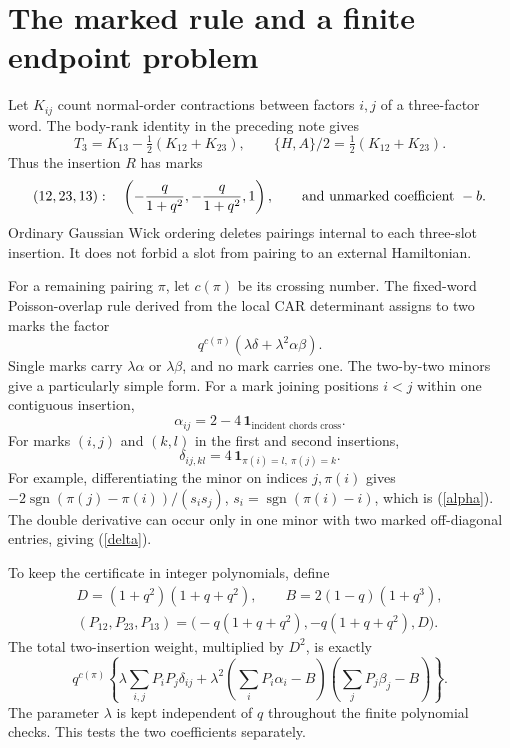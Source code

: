 \documentclass[11pt,a4paper]{article}
\begin{document}
\newpage
\section{The marked rule and a finite endpoint problem}
Let $K_{ij}$ count normal-order contractions between factors $i,j$
of a three-factor word. The body-rank identity in the preceding
note gives
\[
 T_3=K_{13}-\tfrac12(K_{12}+K_{23}),\qquad
 \{H,A\}/2=\tfrac12(K_{12}+K_{23}).
\]
Thus the insertion $R$ has marks
\begin{equation}
 (12,23,13):\quad
 \left(-\frac{q}{1+q^2},-\frac{q}{1+q^2},1\right),
 \qquad\hbox{and unmarked coefficient }-b.             \label{marks}
\end{equation}
Ordinary Gaussian Wick ordering deletes pairings internal to each
three-slot insertion. It does not forbid a slot from pairing to an
external Hamiltonian.

For a remaining pairing $\pi$, let $c(\pi)$ be its crossing number.
The fixed-word Poisson-overlap rule derived from the local CAR
determinant assigns to two marks the factor
\begin{equation}
 q^{c(\pi)}(\lambda\delta+\lambda^2\alpha\beta).
\end{equation}
Single marks carry $\lambda\alpha$ or $\lambda\beta$, and no mark
carries one. The two-by-two minors give a particularly simple form.
For a mark joining positions $i<j$ within one contiguous insertion,
\begin{equation}
 \alpha_{ij}=2-4\,\mathbf1_{\text{incident chords cross}}. \label{alpha}
\end{equation}
For marks $(i,j)$ and $(k,l)$ in the first and second insertions,
\begin{equation}
 \delta_{ij,kl}
 =4\,\mathbf1_{\pi(i)=l,\ \pi(j)=k}.                   \label{delta}
\end{equation}
For example, differentiating the minor on indices $j,\pi(i)$
gives
$-2\operatorname{sgn}(\pi(j)-\pi(i))/(s_i s_j)$,
$s_i=\operatorname{sgn}(\pi(i)-i)$, which is (\ref{alpha}).
The double derivative can occur only in one minor with two marked
off-diagonal entries, giving (\ref{delta}).

To keep the certificate in integer polynomials, define
\begin{gather}
 D=(1+q^2)(1+q+q^2),\qquad B=2(1-q)(1+q^3),\\
 (P_{12},P_{23},P_{13})
 =\bigl(-q(1+q+q^2),-q(1+q+q^2),D\bigr).
\end{gather}
The total two-insertion weight, multiplied by $D^2$, is exactly
\begin{equation}
 q^{c(\pi)}
 \left\{\lambda\sum_{i,j}P_iP_j\delta_{ij}
 +\lambda^2\left(\sum_iP_i\alpha_i-B\right)
              \left(\sum_jP_j\beta_j-B\right)\right\}. \label{poly}
\end{equation}
The parameter $\lambda$ is kept independent of $q$ throughout the
finite polynomial checks. This tests the two coefficients separately.
\end{document}

